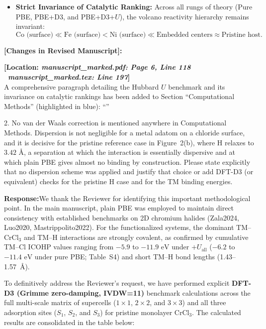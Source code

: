 \documentclass[11pt, sans, a4paper]{moderncv}
\newcommand{\response}{\vspace{0.4em}\noindent\textbf{\color{actionblue}Response:}\hspace{0.5em}}
\newcommand{\manuscriptchange}[1]{{\renewcommand{\label}[1]{}\vspace{0.4em}\noindent\textbf{\color{acsblue}[Changes in Revised Manuscript]:}\par\nopagebreak\vspace{0.15em}#1\vspace{0.4em}}}
\begin{document}
\begin{enumerate}[leftmargin=1.5em, itemsep=0.2em]
\begin{itemize}[leftmargin=1.2em, itemsep=0.1em]
\item \textbf{Strict Invariance of Catalytic Ranking:} Across all rungs of theory (Pure PBE, PBE+D3, and PBE+D3+$U$), the volcano reactivity hierarchy remains invariant:
\[
\text{Co (surface)} \ll \text{Fe (surface)} < \text{Ni (surface)} \ll \text{Embedded centers} \approx \text{Pristine host}.
\]
\end{itemize}
\end{enumerate}

\manuscriptchange{\textbf{[Location: \textit{manuscript\_marked.pdf: Page 6, Line 118} \textbar\ \textit{manuscript\_marked.tex: Line 197}]}\\ A comprehensive paragraph detailing the Hubbard $U$ benchmark and its invariance on catalytic rankings has been added to Section ``Computational Methods'' (highlighted in blue): ``{\itshape \ExecuteMetaData[manuscript_marked.tex]{PBEHubbardU}}''}

\vspace{0.8em}

\begin{reviewercomment}
2. No van der Waals correction is mentioned anywhere in Computational Methods. Dispersion is not negligible for a metal adatom on a chloride surface, and it is decisive for the pristine reference case in Figure~2(b), where H relaxes to $3.42\text{ \AA}$, a separation at which the interaction is essentially dispersive and at which plain PBE gives almost no binding by construction. Please state explicitly that no dispersion scheme was applied and justify that choice or add DFT-D3 (or equivalent) checks for the pristine H case and for the TM binding energies.
\end{reviewercomment}

\response We thank the Reviewer for identifying this important methodological point. In the main manuscript, plain PBE was employed to maintain direct consistency with established benchmarks on 2D chromium halides (Zala2024, Luo2020, Mastrippolito2022). For the functionalized systems, the dominant TM--CrCl$_3$ and TM--H interactions are strongly covalent, as confirmed by cumulative TM--Cl ICOHP values ranging from $-5.9$ to $-11.9\text{ eV}$ under $+U_{\mathrm{all}}$ ($-6.2$ to $-11.4\text{ eV}$ under pure PBE; Table~S4) and short TM--H bond lengths (1.43--1.57~\AA).

To definitively address the Reviewer's request, we have performed explicit \textbf{DFT-D3 (Grimme zero-damping, IVDW=11)} benchmark calculations across the full multi-scale matrix of supercells ($1\times 1$, $2\times 2$, and $3\times 3$) and all three adsorption sites ($S_1$, $S_2$, and $S_3$) for pristine monolayer $\text{CrCl}_3$. The calculated results are consolidated in the table below:
\end{document}

